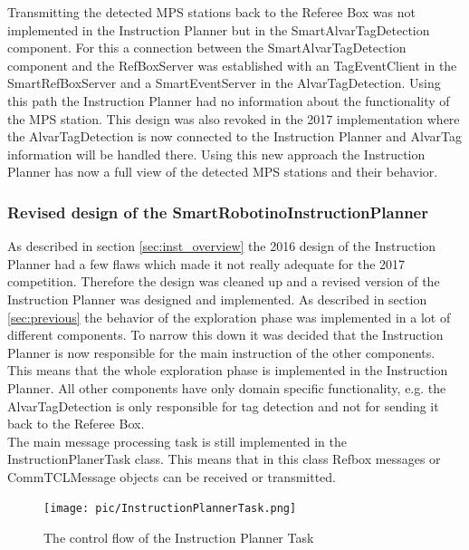Transmitting the detected MPS stations back to the Referee Box was not implemented in the Instruction Planner but in the SmartAlvarTagDetection component. For this a connection between the SmartAlvarTagDetection component and the RefBoxServer was established with an TagEventClient in the SmartRefBoxServer and a SmartEventServer in the AlvarTagDetection. Using this path the Instruction Planner had no information about the functionality of the MPS station. This design was also revoked in the 2017 implementation where the AlvarTagDetection is now connected to the Instruction Planner and AlvarTag information will be handled there. Using this new approach the Instruction Planner has now a full view of the detected MPS stations and their behavior. 
  

\subsubsection{Revised design of the SmartRobotinoInstructionPlanner}
\label{sec:new_design}

As described in section \ref{sec:inst_overview} the 2016 design of the Instruction Planner had a few flaws which made it not really adequate for the 2017 competition. Therefore the design was cleaned up and a revised version of the Instruction Planner was designed and implemented. As described in section \ref{sec:previous} the behavior of the exploration phase was implemented in a lot of different components. To narrow this down it was decided that the Instruction Planner is now responsible for the main instruction of the other components. This means that the whole exploration phase is implemented in the Instruction Planner. All other components have only domain specific functionality, e.g. the AlvarTagDetection is only responsible for tag detection and not for sending it back to the Referee Box. \\

The main message processing task is still implemented in the InstructionPlanerTask class. This means that in this class Refbox messages or CommTCLMessage objects can be received or transmitted. 


\begin{figure}[h]
\centering
\texttt{[image: pic/InstructionPlannerTask.png]}
\caption{The control flow of the Instruction Planner Task}
\label{fig:instructionplannertask}
\end{figure}
 
